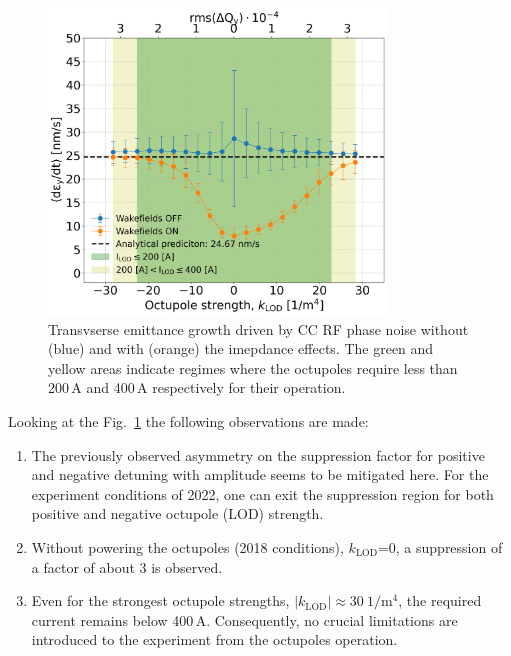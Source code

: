 \begin{figure}[!h] %
   \centering         
   \includegraphics[width=0.8\textwidth]{images/Ch8/deyRates_sps_270GeV_PN1e-8_400MHz_SPS_NewWakesAllcontributions_appendWakes_y-plane_WakesONvsOFF_QpxQpy1_6D_Nb5e5_intensity3e10Scan_vs_TuneSpreadvsExpectedSPS_octupole_current.png}
       \caption{Transvserse emittance growth driven by CC RF phase noise without (blue) and with (orange) the imepdance effects. The green and yellow areas indicate regimes where the octupoles require less than 200\,A and 400\,A respectively for their operation.}
       \label{fig:pyheadtail_cc_impedance_2022_md_octupole_current}
\end{figure}

Looking at the Fig.~\ref{fig:pyheadtail_cc_impedance_2022_md_octupole_current} the following observations are made:
\begin{enumerate}
   \item The previously observed asymmetry on the suppression factor for positive and negative detuning with amplitude seems to be mitigated here. For the experiment conditions of 2022, one can exit the suppression region for both positive and negative octupole (LOD) strength.
   \item Without powering the octupoles (2018 conditions), $k_\mathrm{LOD}$=0, a suppression of a factor of about 3 is observed.
   \item Even for the strongest octupole strengths, $| k_\mathrm{LOD} |\approx 30 \ \mathrm{1/m^4}$, the required current remains below 400\,A. Consequently, no crucial limitations are introduced to the experiment from the octupoles operation.
\end{enumerate}


